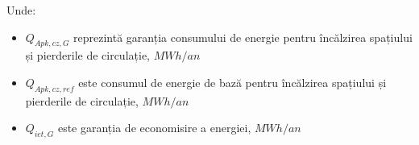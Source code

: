 \begin{enumerate}
\begin{enumerate}
      \end{enumerate}

    Unde:
    \begin{itemize}[label={}]
	\item $Q_{Apk, cz, G}$  \quad reprezintă garanția consumului de energie pentru încălzirea spațiului și pierderile de circulație, $MWh/an$
	\item $Q_{Apk, cz,ref}$ \quad este consumul de energie de bază pentru încălzirea spațiului și pierderile de circulație, $MWh/an$
	\item $Q_{iet,G}$ \quad \quad este garanția de economisire a energiei, $MWh/an$
\end{itemize}

\end{enumerate}
